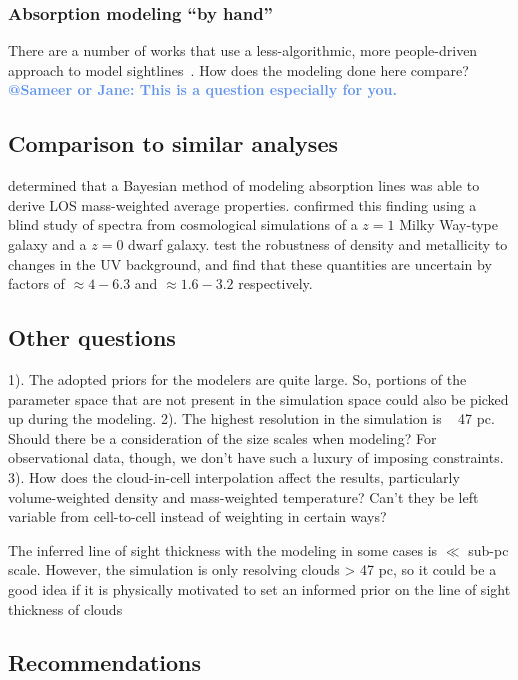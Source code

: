 \documentclass[fleqn,usenatbib]{mnras}
\makeatletter
\newcommand{\atsameer}[1]{\textcolor{CornflowerBlue}{\textbf{@Sameer or Jane: #1}}}
\makeatother
\begin{document}
\subsubsection{Absorption modeling ``by hand''}

There are a number of works that use a less-algorithmic, more people-driven approach to model sightlines~\citep[e.g.][]{Lacki2010}.
How does the modeling done here compare?
\atsameer{This is a question especially for you.}

\subsection{Comparison to similar analyses}

\cite{Liang2018} determined that a Bayesian method of modeling absorption lines was able to derive LOS mass-weighted average properties.
\cite{Marra2021} confirmed this finding using a blind study of spectra from cosmological simulations of a $z=1$ Milky Way-type galaxy and a $z=0$ dwarf galaxy.
\cite{Acharya2021} test the robustness of density and metallicity to changes in the UV background, and find that these quantities are uncertain by factors of $\approx 4-6.3$ and $\approx 1.6-3.2$ respectively.
\cite{Sameer2021} 

\subsection{Other questions}

1). The adopted priors for the modelers are quite large. So, portions of the parameter space that are not present in the simulation space could also be picked up during the modeling.
2). The highest resolution in the simulation is ~ 47 pc. Should there be a consideration of the size scales when modeling? For observational data, though, we don't have such a luxury of imposing constraints.
3). How does the cloud-in-cell interpolation affect the results, particularly volume-weighted density and mass-weighted temperature? Can't they be left variable from cell-to-cell instead of weighting in certain ways?

The inferred line of sight thickness with the modeling in some cases is $\ll$ sub-pc scale.
However, the simulation is only resolving clouds > 47 pc, so it could be a good idea if it is physically motivated to set an informed prior on the line of sight thickness of clouds

\subsection{Recommendations}
\end{document}
